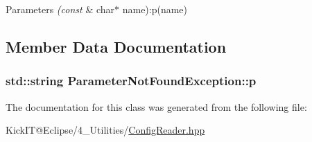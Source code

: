 \begin{DoxyParams}{Parameters}
{\em (const} & char$\ast$ name)\+:p(name) \\
\hline
\end{DoxyParams}


\subsection{Member Data Documentation}
\subsubsection[{\texorpdfstring{p}{p}}]{\setlength{\rightskip}{0pt plus 5cm}std\+::string Parameter\+Not\+Found\+Exception\+::p\hspace{0.3cm}{\ttfamily [protected]}}\hypertarget{class_parameter_not_found_exception_ad7c9297e67fc1021feec3c74a6dcdffa}{}\label{class_parameter_not_found_exception_ad7c9297e67fc1021feec3c74a6dcdffa}


The documentation for this class was generated from the following file\+:\begin{DoxyCompactItemize}
\item 
Kick\+I\+T@\+Eclipse/4\+\_\+\+Utilities/\hyperlink{_config_reader_8hpp}{Config\+Reader.\+hpp}\end{DoxyCompactItemize}
